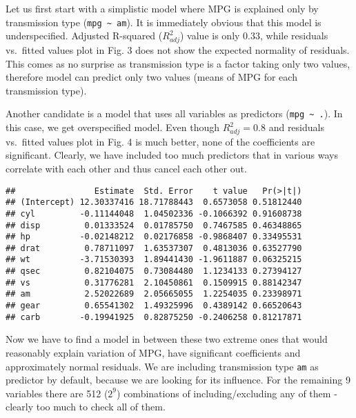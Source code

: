 \documentclass[10pt,]{article}
\begin{document}
Let us first start with a simplistic model where MPG is explained only
by transmission type (\texttt{mpg \textasciitilde{} am}). It is
immediately obvious that this model is underspecified. Adjusted
R-squared ($R^2_{adj}$) value is only 0.33, while residuals vs.~fitted
values plot in Fig. 3 does not show the expected normality of residuals.
This comes as no surprise as transmission type is a factor taking only
two values, therefore model can predict only two values (means of MPG
for each transmission type).

Another candidate is a model that uses all variables as predictors
(\texttt{mpg \textasciitilde{} .}). In this case, we get overspecified
model. Even though $R^2_{adj}=0.8$ and residuals vs.~fitted values plot
in Fig. 4 is much better, none of the coefficients are significant.
Clearly, we have included too much predictors that in various ways
correlate with each other and thus cancel each other out.

\begin{verbatim}
##                Estimate  Std. Error    t value   Pr(>|t|)
## (Intercept) 12.30337416 18.71788443  0.6573058 0.51812440
## cyl         -0.11144048  1.04502336 -0.1066392 0.91608738
## disp         0.01333524  0.01785750  0.7467585 0.46348865
## hp          -0.02148212  0.02176858 -0.9868407 0.33495531
## drat         0.78711097  1.63537307  0.4813036 0.63527790
## wt          -3.71530393  1.89441430 -1.9611887 0.06325215
## qsec         0.82104075  0.73084480  1.1234133 0.27394127
## vs           0.31776281  2.10450861  0.1509915 0.88142347
## am           2.52022689  2.05665055  1.2254035 0.23398971
## gear         0.65541302  1.49325996  0.4389142 0.66520643
## carb        -0.19941925  0.82875250 -0.2406258 0.81217871
\end{verbatim}

Now we have to find a model in between these two extreme ones that would
reasonably explain variation of MPG, have significant coefficients and
approximately normal residuals. We are including transmission type
\texttt{am} as predictor by default, because we are looking for its
influence. For the remaining 9 variables there are 512 ($2^9$)
combinations of including/excluding any of them - clearly too much to
check all of them.
\end{document}
